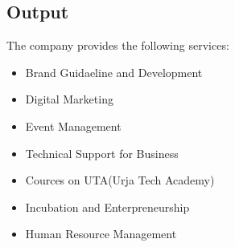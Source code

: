       \subsection{Output}
      The company provides the following services:
      \begin{itemize}
        \item Brand Guidaeline and Development
        \item Digital Marketing
        \item Event Management
        \item Technical Support for Business
        \item Cources on UTA(Urja Tech Academy)
        \item Incubation and Enterpreneurship
        \item Human Resource Management
      \end{itemize}

